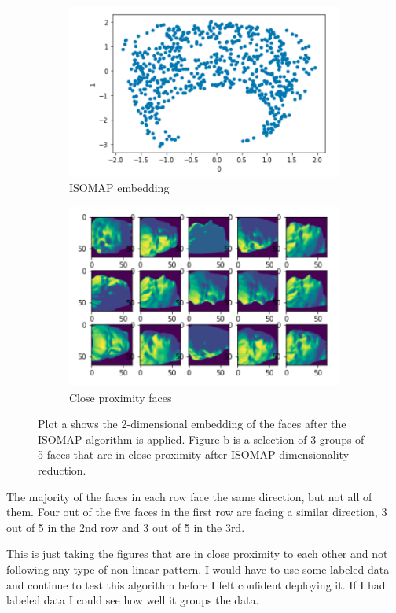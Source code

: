 \documentclass[a4paper]{article}
\begin{document}
\newpage
\begin{figure}[h]
    \centering
    \begin{subfigure}[b]{0.4\textwidth}
        \includegraphics[width=\textwidth]{embedding.png}
        \caption{ISOMAP embedding}
        \label{embedding}
    \end{subfigure}
    \begin{subfigure}[b]{0.4\textwidth}
        \includegraphics[width=\textwidth]{iso_faces.png}
        \caption{Close proximity faces}
        \label{iso_faces}
    \end{subfigure}
    \caption{Plot a shows the 2-dimensional embedding of the faces after the ISOMAP algorithm is applied.  Figure b is a selection of 3 groups of 5 faces that are in close proximity after ISOMAP dimensionality reduction.}\label{clusterCompare}
\end{figure}


The majority of the faces in each row face the same direction, but not all of them.  Four out of the five faces in the first row are facing a similar direction, 3 out of 5 in the 2nd row and 3 out of 5 in the 3rd.  

This is just taking the figures that are in close proximity to each other and not following any type of non-linear pattern.  I would have to use some labeled data and continue to test this algorithm before I felt confident deploying it.  If I had labeled data I could see how well it groups the data.  
\end{document}

